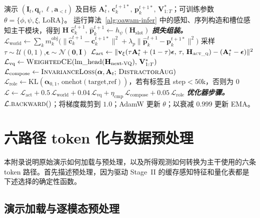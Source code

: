 \begin{algorithm}[H]
\caption{\method{} Stage-II 训练步骤（一个 mini-batch）。}
\label{alg:oawam-train}
\begin{algorithmic}[1]
\Require 演示 $(\mathbf{I}_t,\mathbf{q}_t,\ell,\mathbf{a}_{<t})$ 及目标 $\mathbf{A}_t^{*},\,\mathbf{c}_k^{t+1*},\,\mathbf{p}_k^{t+1*},\,\mathbf{V}_{1:T}^{*}$；可训练参数 $\theta\!=\!\{\phi,\psi,\xi,\,\text{LoRA}\}$。
\State 运行算法~\ref{alg:oawam-infer} 中的感知、序列构造和槽位感知主干模块，得到 $\mathbf{H}$
\State $\hat{\mathbf{c}}_k^{t+1},\,\hat{\mathbf{p}}_k^{t+1}\gets h_\psi(\mathbf{H}_\text{slot})$ 
\Statex \textit{\textbf{损失组装。}}
\State $\mathcal{L}_\text{world}\gets\sum_k m_k^\text{obj}\bigl(\|\hat{\mathbf{c}}_k^{t+1}-\mathbf{c}_k^{t+1*}\|^2+\lambda_p\|\hat{\mathbf{p}}_k^{t+1}-\mathbf{p}_k^{t+1*}\|^2\bigr)$
\State 采样 $\tau\sim\mathcal{U}(0,1)$,\quad $\boldsymbol{\epsilon}\sim\mathcal{N}(\mathbf{0},\mathbf{I})$
\State $\mathcal{L}_\text{act}\gets\|\mathbf{v}_\xi(\tau\mathbf{A}_t^{*}+(1-\tau)\boldsymbol{\epsilon},\,\tau,\,\mathbf{H}_{\textsc{act\_q}})-(\mathbf{A}_t^{*}-\boldsymbol{\epsilon})\|^2$ 
\State $\mathcal{L}_\text{vq}\gets\textsc{WeightedCE}(\text{lm\_head}(\mathbf{H}_\text{next-VQ}),\,\mathbf{V}_{1:T}^{*})$
\State $\mathcal{L}_\text{compose}\gets\textsc{InvarianceLoss}(\boldsymbol{\alpha},\mathbf{A}_t;\,\textsc{DistractorAug})$ 
\State $\mathcal{L}_\text{role}\gets\mathrm{KL}(\boldsymbol{\alpha}_{0,1},\,\text{onehot}(\text{target,ref}))$，若有标签且 step$<\!50$k，否则为 $0$
\State $\mathcal{L}\gets\mathcal{L}_\text{act}+0.5\,\mathcal{L}_\text{world}+0.04\,\mathcal{L}_\text{vq}+\eta_\text{cmp}\,\mathcal{L}_\text{compose}+0.05\,\mathcal{L}_\text{role}$
\Statex \textit{\textbf{优化器步骤。}}
\State $\mathcal{L}.\textsc{backward}()$；将梯度裁剪到 $1.0$；AdamW 更新 $\theta$；以衰减 $0.999$ 更新 EMA。
\end{algorithmic}
\end{algorithm}

\section{六路径 token 化与数据预处理}
\label{app:tokenizer-detail}

本附录说明原始演示如何加载与预处理，以及所得观测如何转换为主干使用的六条 token 路径。首先描述预处理，因为驱动 Stage~II 的缓存感知特征和量化表都是下述选择的确定性函数。

\subsection*{演示加载与逐模态预处理}

